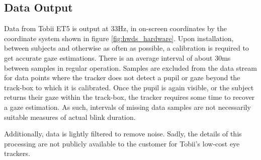 \subsection{Data Output}

Data from Tobii ET5 is output at 33Hz, in on-screen coordinates by the coordinate system shown in figure \ref{fig:hwds_hardware}. Upon installation, between subjects and otherwise as often as possible, a calibration is required to get accurate gaze estimations. There is an average interval of about 30ms between samples in regular operation. Samples are excluded from the data stream for data points where the tracker does not detect a pupil or gaze beyond the track-box to which it is calibrated. Once the pupil is again visible, or the subject returns their gaze within the track-box, the tracker requires some time to recover a gaze estimation. As such, intervals of missing data samples are not necessarily suitable measures of actual blink duration.

Additionally, data is lightly filtered to remove noise. Sadly, the details of this processing are not publicly available to the customer for Tobii's low-cost eye trackers. 